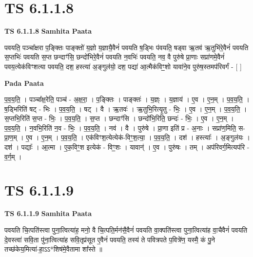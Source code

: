 \documentclass[17pt]{extarticle}
\begin{document}
\section*{ TS 6.1.1.8 }

\textbf{TS 6.1.1.8 } \newline
\textbf{Samhita Paata} \newline

पवयति॒ पञ्चा᳚क्षरा प॒ङ्क्तिः पाङ्क्तो॑ य॒ज्ञो य॒ज्ञायै॒वैनं॑ पवयति ष॒ड्भिः प॑वयति॒ षड्वा ऋ॒तव॑ ऋ॒तुभि॑रे॒वैनं॑ पवयति स॒प्तभिः॑ पवयति स॒प्त छन्दाꣳ॑सि॒ छन्दो॑भिरे॒वैनं॑ पवयति न॒वभिः॑ पवयति॒ नव॒ वै पुरु॑षे प्रा॒णाः सप्रा॑णमे॒वैनं॑ पवय॒त्येक॑विꣳशत्या पवयति॒ दश॒ हस्त्या॑ अ॒ङ्गुल॑यो॒ दश॒ पद्या॑ आ॒त्मैक॑विꣳ॒॒शो यावा॑ने॒व पुरु॑ष॒स्तमप॑रिवर्गं - [  ] \newline

\textbf{Pada Paata} \newline

प॒व॒य॒ति॒ । पञ्चा᳚क्ष॒रेति॒ पञ्च॑ - अ॒क्ष॒रा॒ । प॒ङ्क्तिः । पाङ्क्तः॑ । य॒ज्ञ्ः । य॒ज्ञाय॑ । ए॒व । ए॒न॒म् । प॒व॒य॒ति॒ । ष॒ड्भिरिति॑ षट् - भिः । प॒व॒य॒ति॒ । षट् । वै । ऋ॒तवः॑ । ऋ॒तुभि॒रित्यृ॒तु - भिः॒ । ए॒व । ए॒न॒म् । प॒व॒य॒ति॒ । स॒प्तभि॒रिति॑ स॒प्त - भिः॒ । प॒व॒य॒ति॒ । स॒प्त । छन्दाꣳ॑सि । छन्दो॑भि॒रिति॒ छन्दः॑ - भिः॒ । ए॒व । ए॒न॒म् । प॒व॒य॒ति॒ । न॒वभि॒रिति॑ न॒व - भिः॒ । प॒व॒य॒ति॒ । नव॑ । वै । पुरु॑षे । प्रा॒णा इति॑ प्र - अ॒नाः । सप्रा॑ण॒मिति॒ स-प्रा॒ण॒म् । ए॒व । ए॒न॒म् । प॒व॒य॒ति॒ । एक॑विꣳश॒त्येत्येक॑-विꣳ॒॒श॒त्या॒ । प॒व॒य॒ति॒ । दश॑ । हस्त्याः᳚ । अ॒ङ्गुल॑यः । दश॑ । पद्याः᳚ । आ॒त्मा । ए॒क॒विꣳ॒॒श इत्येक॑ - विꣳ॒॒शः । यावान्॑ । ए॒व । पुरु॑षः । तम् । अप॑रिवर्ग॒मित्यप॑रि - व॒र्ग॒म् ।  \newline




\section*{ TS 6.1.1.9 }

\textbf{TS 6.1.1.9 } \newline
\textbf{Samhita Paata} \newline

पवयति चि॒त्पति॑स्त्वा पुना॒त्वित्या॑ह॒ मनो॒ वै चि॒त्पति॒र्मन॑सै॒वैनं॑ पवयति वा॒क्पति॑स्त्वा पुना॒त्वित्या॑ह वा॒चैवैनं॑ पवयति दे॒वस्त्वा॑ सवि॒ता पु॑ना॒त्वित्या॑ह सवि॒तृप्र॑सूत ए॒वैनं॑ पवयति॒ तस्य॑ ते पवित्रपते प॒वित्रे॑ण॒ यस्मै॒ कं पु॒ने तच्छ॑केय॒मित्या॑-हा॒ऽऽ*शिष॑मे॒वैतामा शा᳚स्ते ॥ \newline
\end{document}
